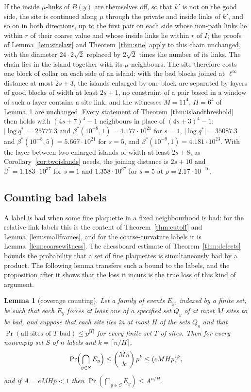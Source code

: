 \documentclass[11pt]{amsart}
\newtheorem{lemma}[theorem]{Lemma}
\theoremstyle{definition}
\theoremstyle{remark}
\numberwithin{equation}{section}
\begin{document}
If the inside $\mu$-links of $B(y)$ are themselves off, so that $k'$ is not
on the good side, the site is continued along $\mu$ through the private
and inside links of $k'$, and so on in both directions, up to the first
pair on each side whose non-path links lie within $r$ of their coarse
value and whose inside links lie within $r$ of $I$; the proofs of
Lemma~\ref{lem:sitelaw} and Theorem~\ref{thm:site} apply to this chain
unchanged, with the diameter $24\cdot2\sqrt2$ replaced by $2\sqrt2$ times
the number of its links. The chain lies in the island together with its
$\mu$-neighbours. The site therefore costs one block of collar on each
side of an island: with the bad blocks joined at $\ell^\infty$ distance at
most $2s+3$, the islands enlarged by one block are separated by layers of
good blocks of width at least $2s+1$, no constraint of a pair based in a
window of such a layer contains a site link, and the witnesses $M=11^4$,
$H=6^4$ of Lemma~\ref{lem:coverage} are unchanged. Every statement of
Theorem~\ref{thm:islandthreshold} then holds with $(4s+7)^4-1$ neighbours
in place of $(4s+3)^4-1$: $\lvert\log q^*\rvert=25777.3$ and
$\beta^*(10^{-8},1)=4.177\cdot10^{21}$ for $s=1$, $\lvert\log q^*\rvert=
35087.3$ and $\beta^*(10^{-8},5)=5.667\cdot10^{21}$ for $s=5$, and
$\beta^*(10^{-9},1)=4.181\cdot10^{23}$. With the layer between two enlarged
islands of width at least $2s+8$, as Corollary~\ref{cor:twoislands} needs,
the joining distance is $2s+10$ and $\beta^*=1.183\cdot10^{37}$ for $s=1$
and $1.358\cdot10^{37}$ for $s=5$ at $\rho=2.17\cdot10^{-16}$.

\subsection{Counting bad labels}\label{ssec:counting}

A label is bad when some fine plaquette in a fixed neighbourhood is bad:
for the relative link labels this is the content of
Theorem~\ref{thm:cutoff} and Lemma~\ref{lem:smallframes}, and for the
coarse-curvature labels it is Lemma~\ref{lem:coarsewitness}. The chessboard
estimate of Theorem~\ref{thm:defects} bounds the probability that a set of
fine plaquettes is simultaneously bad by a product. The following lemma
transfers such a bound to the labels, and the proposition after it shows
that the loss it incurs is the true loss of this kind of argument.

\begin{lemma}[coverage counting]\label{lem:coverage}
Let a family of events $E_y$, indexed by a finite set, be such that each
$E_y$ forces at least one of a specified set $Q_y$ of at most $M$ sites to
be bad, and suppose that each site lies in at most $H$ of the sets $Q_y$
and that $\Pr(\text{all sites of }T\text{ bad})\le p^{|T|}$ for every
finite set $T$ of sites. Then for every nonempty set $S$ of $n$ labels and
$k=\lceil n/H\rceil$,
\[
\Pr\Bigl(\bigcap_{y\in S}E_y\Bigr)\le\binom{Mn}k\,p^k\le(eMHp)^k ,
\]
and if $A=eMHp<1$ then $\Pr(\bigcap_{y\in S}E_y)\le A^{n/H}$.
\end{lemma}
\end{document}
